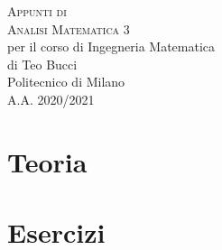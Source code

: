 \documentclass[10pt,a4paper,twoside]{book}
\begin{document}
\frontmatter

\pagestyle{empty}


\hypertarget{mytitlepage}{} %

\vspace*{\fill}

\begin{center}
	{\large \textsc{Appunti di}}\\
	\vspace*{0.4cm}
	{\Huge \textsc{Analisi Matematica 3}}\\
	\vspace*{1cm}
	{\large per il corso di Ingegneria Matematica}\\
	\vspace*{0.4cm}
	{\large {di Teo Bucci}}\\
	\vspace*{1cm}
	Politecnico di Milano\\
	A.A. 2020/2021
\end{center}
\vspace*{\fill}
\clearpage


\hypertarget{mycopyright}{} %

\clearpage


% 


\cleardoublepage
\pagestyle{toc}
\hypertarget{mytoc}{} %
\bookmark[dest=mytoc,level=chapter]{\contentsname} %
\tableofcontents
\cleardoublepage


\pagestyle{fancy}
\mainmatter

\part{Teoria}
 \cleardoublepage

\part{Esercizi}
 \cleardoublepage
\end{document}
